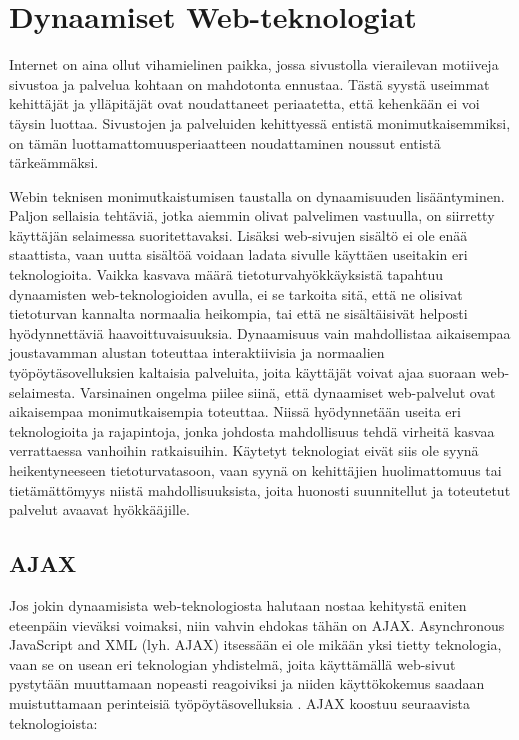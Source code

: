 
\chapter{Dynaamiset Web-teknologiat}

Internet on aina ollut vihamielinen paikka, jossa sivustolla vierailevan motiiveja sivustoa ja palvelua kohtaan on mahdotonta ennustaa. Tästä syystä 
useimmat kehittäjät ja ylläpitäjät ovat noudattaneet periaatetta, että kehenkään ei voi täysin luottaa. Sivustojen ja palveluiden kehittyessä entistä monimutkaisemmiksi, on tämän 
luottamattomuusperiaatteen noudattaminen noussut entistä tärkeämmäksi.

Webin teknisen monimutkaistumisen taustalla on dynaamisuuden lisääntyminen. Paljon sellaisia tehtäviä, jotka aiemmin olivat palvelimen vastuulla, on siirretty käyttäjän selaimessa 
suoritettavaksi. Lisäksi web-sivujen sisältö ei ole enää staattista, vaan uutta sisältöä voidaan ladata sivulle käyttäen useitakin eri teknologioita. Vaikka kasvava määrä tietoturvahyökkäyksistä 
tapahtuu dynaamisten web-teknologioiden avulla, ei se tarkoita sitä, että ne olisivat tietoturvan kannalta normaalia heikompia, tai että ne sisältäisivät helposti hyödynnettäviä 
haavoittuvaisuuksia. Dynaamisuus vain mahdollistaa aikaisempaa joustavamman alustan toteuttaa interaktiivisia ja normaalien työpöytäsovelluksien 
kaltaisia palveluita, joita käyttäjät voivat ajaa suoraan web-selaimesta. Varsinainen ongelma piilee siinä, että dynaamiset web-palvelut ovat aikaisempaa monimutkaisempia toteuttaa. Niissä 
hyödynnetään useita eri teknologioita ja rajapintoja, jonka johdosta mahdollisuus tehdä virheitä kasvaa verrattaessa vanhoihin ratkaisuihin. Käytetyt teknologiat eivät siis ole syynä 
heikentyneeseen tietoturvatasoon, vaan syynä on kehittäjien huolimattomuus tai tietämättömyys niistä mahdollisuuksista, joita huonosti suunnitellut ja toteutetut palvelut avaavat hyökkääjille.

\section {AJAX}

Jos jokin dynaamisista web-teknologiosta halutaan nostaa kehitystä eniten eteenpäin vieväksi voimaksi, niin vahvin ehdokas tähän on AJAX. Asynchronous JavaScript and XML (lyh. AJAX)
itsessään ei ole mikään yksi tietty teknologia, vaan se on usean eri teknologian yhdistelmä, joita käyttämällä web-sivut pystytään muuttamaan nopeasti reagoiviksi ja niiden 
käyttökokemus saadaan muistuttamaan perinteisiä työpöytäsovelluksia \cite{AJAX}. AJAX koostuu seuraavista teknologioista:

